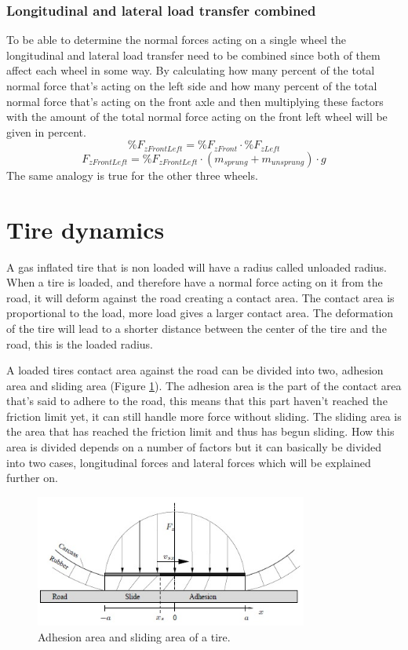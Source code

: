 \subsubsection{Longitudinal and lateral load transfer combined}
To be able to determine the normal forces acting on a single wheel the longitudinal and lateral load transfer need to be combined since both of them affect each wheel in some way. By calculating how many percent of the total normal force that's acting on the left side and how many percent of the total normal force that's acting on the front axle and then multiplying these factors with the amount of the total normal force acting on the front left wheel will be given in percent.
\begin{equation} \label{eq:normal_percent}
	\%F_{zFrontLeft} = \%F_{zFront}\cdot \%F_{zLeft}
\end{equation}
\begin{equation} \label{eq:normal_percent_final}
	F_{zFrontLeft} = \%F_{zFrontLeft}\cdot (m_{sprung}+m_{unsprung})\cdot g
\end{equation}
The same analogy is true for the other three wheels.
	 
\section{Tire dynamics}
A gas inflated tire that is non loaded will have a radius called unloaded radius. When a tire is loaded, and therefore have a normal force acting on it from the road, it will deform against the road creating a contact area. The contact area is proportional to the load, more load gives a larger contact area. The deformation of the tire will lead to a shorter distance between the center of the tire and the road, this is the loaded radius. 

A loaded tires contact area against the road can be divided into two, adhesion area and sliding area (Figure \ref{adh_sliding}). The adhesion area is the part of the contact area that's said to adhere to the road, this means that this part haven't reached the friction limit yet, it can still handle more force without sliding. The sliding area is the area that has reached the friction limit and thus has begun sliding. How this area is divided depends on a number of factors but it can basically be divided into two cases, longitudinal forces and lateral forces which will be explained further on.
\begin{figure}[h]
	\centering
	\includegraphics[width=0.8\textwidth]{Pictures/adh_sliding}
	\caption{Adhesion area and sliding area of a tire. \cite{svendenius2013}}
	\label{adh_sliding}
\end{figure}

